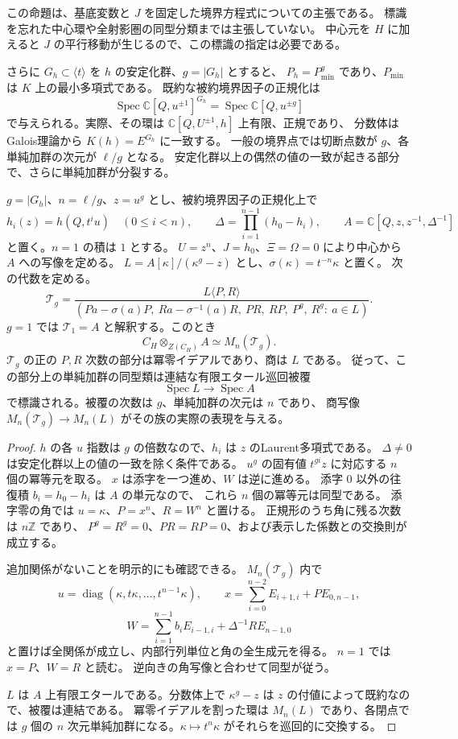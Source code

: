 この命題は、基底変数と $J$ を固定した境界方程式についての主張である。
標識を忘れた中心環や全射影圏の同型分類までは主張していない。
中心元を $H$ に加えると $J$ の平行移動が生じるので、この標識の指定は必要である。

さらに $G_h\subset\langle t\rangle$ を $h$ の安定化群、$g=|G_h|$ とすると、
$P_h=P_{\mathrm{min}}^g$ であり、$P_{\mathrm{min}}$ は $K$ 上の最小多項式である。
既約な被約境界因子の正規化は
\[
 \operatorname{Spec}\mathbb C[Q,u^{\pm1}]^{G_h}
 =\operatorname{Spec}\mathbb C[Q,u^{\pm g}]
\]
で与えられる。実際、その環は $\mathbb C[Q,U^{\pm1},h]$ 上有限、正規であり、
分数体はGalois理論から $K(h)=E^{G_h}$ に一致する。
一般の境界点では切断点数が $g$、各単純加群の次元が $\ell/g$ となる。
安定化群以上の偶然の値の一致が起きる部分で、さらに単純加群が分裂する。

\begin{theorem}[一般の境界における巡回降下と単純加群の被覆]
\label{thm:boundary-cyclic-descent-v39}
$g=|G_h|$、$n=\ell/g$、$z=u^g$ とし、被約境界因子の正規化上で
\[
 h_i(z)=h(Q,t^iu)\quad(0\le i<n),\qquad
 \Delta=\prod_{i=1}^{n-1}(h_0-h_i),\qquad
 A=\mathbb C[Q,z,z^{-1},\Delta^{-1}]
\]
と置く。$n=1$ の積は $1$ とする。
$U=z^n$、$J=h_0$、$\Xi=\Omega=0$ により中心から $A$ への写像を定める。
$L=A[\kappa]/(\kappa^g-z)$ とし、$\sigma(\kappa)=t^{-n}\kappa$ と置く。
次の代数を定める。
\[
 \mathcal T_g=
 \frac{L\langle P,R\rangle}
 {(Pa-\sigma(a)P,\ Ra-\sigma^{-1}(a)R,\ PR,\ RP,\ P^g,\ R^g:\ a\in L)}.
\]
$g=1$ では $\mathcal T_1=A$ と解釈する。このとき
\[
 C_H\otimes_{Z(C_H)}A\simeq M_n(\mathcal T_g).
\]
$\mathcal T_g$ の正の $P,R$ 次数の部分は冪零イデアルであり、商は $L$ である。
従って、この部分上の単純加群の同型類は連結な有限エタール巡回被覆
\[
 \operatorname{Spec}L\longrightarrow\operatorname{Spec}A
\]
で標識される。被覆の次数は $g$、単純加群の次元は $n$ であり、
商写像 $M_n(\mathcal T_g)\to M_n(L)$ がその族の実際の表現を与える。
\end{theorem}

\begin{proof}
$h$ の各 $u$ 指数は $g$ の倍数なので、$h_i$ は $z$ のLaurent多項式である。
$\Delta\ne0$ は安定化群以上の値の一致を除く条件である。
$u^g$ の固有値 $t^{gi}z$ に対応する $n$ 個の冪等元を取る。
$x$ は添字を一つ進め、$W$ は逆に進める。
添字 $0$ 以外の往復積 $b_i=h_0-h_i$ は $A$ の単元なので、
これら $n$ 個の冪等元は同型である。
添字零の角では $u=\kappa$、$P=x^n$、$R=W^n$ と置ける。
正規形のうち角に残る次数は $n\mathbb Z$ であり、
$P^g=R^g=0$、$PR=RP=0$、および表示した係数との交換則が成立する。

追加関係がないことを明示的にも確認できる。
$M_n(\mathcal T_g)$ 内で
\[
 u=\operatorname{diag}(\kappa,t\kappa,\ldots,t^{n-1}\kappa),\qquad
 x=\sum_{i=0}^{n-2}E_{i+1,i}+P E_{0,n-1},
\]
\[
 W=\sum_{i=1}^{n-1}b_iE_{i-1,i}
       +\Delta^{-1}R E_{n-1,0}
\]
と置けば全関係が成立し、内部行列単位と角の全生成元を得る。
$n=1$ では $x=P$、$W=R$ と読む。
逆向きの角写像と合わせて同型が従う。

$L$ は $A$ 上有限エタールである。分数体上で $\kappa^g-z$ は
$z$ の付値によって既約なので、被覆は連結である。
冪零イデアルを割った環は $M_n(L)$ であり、各閉点では $g$ 個の
$n$ 次元単純加群になる。$\kappa\mapsto t^n\kappa$ がそれらを巡回的に交換する。
\end{proof}


